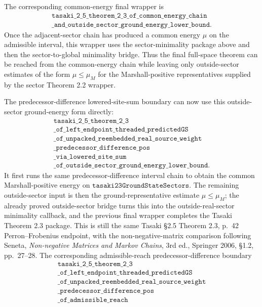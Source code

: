 \documentclass[a4paper,11pt]{article}
\begin{document}
The corresponding common-energy final wrapper is
\[
\begin{gathered}
\texttt{tasaki\_2\_5\_theorem\_2\_3\_of\_common\_energy\_chain}\\
\texttt{\_and\_outside\_sector\_ground\_energy\_lower\_bound}.
\end{gathered}
\]
Once the adjacent-sector chain has produced a common energy \(\mu\)
on the admissible interval, this wrapper uses the sector-minimality
package above and then the sector-to-global minimality bridge.  Thus
the final full-space theorem can be reached from the common-energy
chain while leaving only outside-sector estimates of the form
\(\mu\le\mu_M\) for the Marshall-positive representatives supplied by
the sector Theorem 2.2 wrapper.

The predecessor-difference lowered-site-sum boundary can now use this
outside-sector ground-energy form directly:
\[
\begin{gathered}
\texttt{tasaki\_2\_5\_theorem\_2\_3}\\
\texttt{\_of\_left\_endpoint\_threaded\_predictedGS}\\
\texttt{\_of\_unpacked\_reembedded\_real\_source\_weight}\\
\texttt{\_predecessor\_difference\_pos}\\
\texttt{\_via\_lowered\_site\_sum}\\
\texttt{\_of\_outside\_sector\_ground\_energy\_lower\_bound}.
\end{gathered}
\]
It first runs the same predecessor-difference interval chain to obtain
the common Marshall-positive energy on
\(\texttt{tasaki23GroundStateSectors}\).  The remaining outside-sector
input is then the ground-representative estimate
\(\mu\le\mu_M\); the already proved outside-sector bridge turns this into
the outside-real-sector minimality callback, and the previous final
wrapper completes the Tasaki Theorem 2.3 package.  This is still the
same Tasaki §2.5 Theorem 2.3, p.~42 Perron--Frobenius endpoint, with
the non-negative-matrix comparison following Seneta, \emph{Non-negative
Matrices and Markov Chains}, 3rd ed., Springer 2006, \S1.2,
pp.~27--28.
The corresponding admissible-reach predecessor-difference boundary
\[
\begin{gathered}
\texttt{tasaki\_2\_5\_theorem\_2\_3}\\
\texttt{\_of\_left\_endpoint\_threaded\_predictedGS}\\
\texttt{\_of\_unpacked\_reembedded\_real\_source\_weight}\\
\texttt{\_predecessor\_difference\_pos}\\
\texttt{\_of\_admissible\_reach}
\end{gathered}
\]
\end{document}
